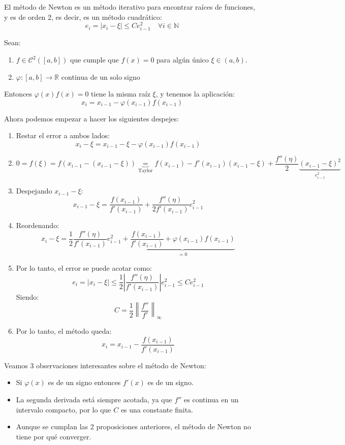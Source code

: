 El método de Newton es un método iterativo para encontrar raíces de funciones, y es de orden 2, es decir, es un método cuadrático:
\[
    e_i = |x_i - \xi| \leq C e_{i-1}^2 \quad \forall i \in \mathbb{N}
\]

\begin{teorema}
    Sean:
    \begin{enumerate}
        \item $f \in \mathcal{C}^2([a,b])$ que cumple que $f(x) = 0$ para algún único $\xi \in (a,b)$.
        \item $\varphi: [a,b] \to \mathbb{R}$ continua de un solo signo
    \end{enumerate}
    Entonces $\varphi(x)f(x) = 0$ tiene la misma raíz $\xi$, y tenemos la aplicación:
    \[
        x_i = x_{i-1} - \varphi(x_{i-1}) f(x_{i-1})
    \]
\end{teorema}

Ahora podemos empezar a hacer los siguientes despejes:
\begin{enumerate}
    \item Restar el error a ambos lados:
    \[
        x_i - \xi = x_{i-1} - \xi - \varphi(x_{i-1}) f(x_{i-1})
    \]
    \item 
    \[
        0 = f(\xi) = f(x_{i-1} - (x_{i-1} - \xi)) \underbrace{=}_{\text{Taylor}} 
        f(x_{i-1}) - f'(x_{i-1})(x_{i-1} - \xi) + \frac{f''(\eta)}{2}\underbrace{(x_{i-1} - \xi)^2}_{e_{i-1}^2}
    \]
    \item Despejando $x_{i-1} - \xi$:
    \[
        x_{i-1} - \xi = \frac{f(x_{i-1})}{f'(x_{i-1})} + \frac{f''(\eta)}{2f'(x_{i-1})} e_{i-1}^2
    \]
    \item Reordenando:
    \[
        x_i - \xi = \frac{1}{2} \frac{f''(\eta)}{f'(x_{i-1})} e_{i-1}^2 +
        \underbrace{\frac{f(x_{i-1})}{f'(x_{i-1})} + \varphi(x_{i-1})f(x_{i-1})}_{= 0}
    \]
    \item Por lo tanto, el error se puede acotar como:
    \[
        e_i = |x_i - \xi| \leq \frac{1}{2} \left| \frac{f''(\eta)}{f'(x_{i-1})} \right| e_{i-1}^2 \leq
        C e_{i-1}^2
    \]
    Siendo:
    \[
        C = \frac{1}{2} \left\| \frac{f''}{f'} \right\|_\infty
    \]
    \item Por lo tanto, el método queda:
    \[
        x_i = x_{i-1} - \frac{f(x_{i-1})}{f'(x_{i-1})}
    \]
\end{enumerate}

\begin{observación}
    Veamos 3 observaciones interesantes sobre el método de Newton:
    \begin{itemize}
        \item Si $\varphi(x)$ es de un signo entonces $f'(x)$ es de un signo.
        \item La segunda derivada está siempre acotada, ya que $f''$ es continua en un intervalo compacto, por lo que $C$ es una constante finita.
        \item Aunque se cumplan las 2 proposiciones anteriores, el método de Newton no tiene por qué converger.
    \end{itemize}
\end{observación}

